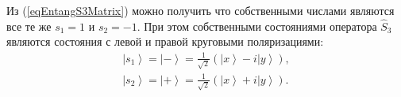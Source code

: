 
Из (\ref{eqEntangS3Matrix}) можно получить что собственными числами
являются все те же $s_1 = 1$ и $s_2 = -1$. При этом собственными
состояниями оператора $\hat{S}_3$ являются состояния с левой и правой
круговыми поляризациями:
\begin{eqnarray}
  \left| s_1 \right> = \left| - \right> = \frac{1}{\sqrt{2}}
  \left(
  \left|x\right> - i \left|y\right>
  \right),
  \nonumber \\
  \left| s_2 \right> = \left| + \right> = \frac{1}{\sqrt{2}}
  \left(
  \left|x\right> + i \left|y\right>
  \right).
  \label{eqEntangS3Eigenvec}
\end{eqnarray}






